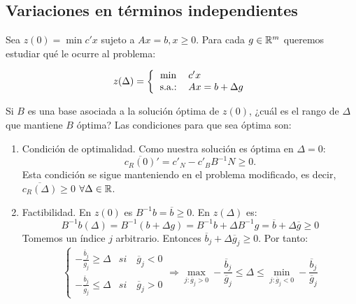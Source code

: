 \documentclass[PM.tex]{subfiles}
\begin{document}
\subsection{Variaciones en términos independientes}

Sea $z(0)= \min c'x$ sujeto a $Ax=b, x\geq 0$. Para cada $g\in\mathbb{R}^m$ queremos estudiar qué le ocurre al problema:

\[
z(\Delta) = \left\{
\begin{tabular}{c l}
	$\min$ & $c'x$\\
	s.a.: & $Ax = b + \Delta g$
\end{tabular}
\right.
\]

Si $B$ es una base asociada a la solución óptima de $z(0)$, ¿cuál es el rango de $\Delta$ que mantiene $B$ óptima? Las condiciones para que sea óptima son:
\begin{enumerate}
\item Condición de optimalidad. Como nuestra solución es óptima en $\Delta =0$: \[\overline{c_R(0)}'=c'_N-c'_B B^{-1}N\geq 0.\]
Esta condición se sigue manteniendo en el problema modificado, es decir, $\overline{c_R(\Delta)}\geq 0$ $\forall \Delta \in \mathbb{R}$.
\item Factibilidad. En $z(0)$ es $B^{-1}b=\overline{b}\geq 0$. En $z(\Delta)$ es:
\[B^{-1}b(\Delta)=B^{-1}(b+\Delta  g)=B^{-1}b+\Delta B^{-1}g=\overline{b}+\Delta\overline{g}\geq 0\]
Tomemos un índice $j$ arbitrario. Entonces $\overline{b}_j+\Delta\overline{g}_j\geq 0$. Por tanto:
\[
\begin{cases}
-\frac{\overline{b}_j}{\overline{g}_j} \geq \Delta & si \quad \overline{g}_j <0\\
-\frac{\overline{b}_j}{\overline{g}_j} \leq \Delta & si \quad \overline{g}_j >0
\end{cases}
\Rightarrow \max_{j:\overline{g}_j >0}-\frac{\overline{b}_j}{\overline{g}_j} \leq \Delta \leq \min_{j:\overline{g}_j <0}-\frac{\overline{b}_j}{\overline{g}_j}\]
\end{enumerate}
\end{document}
